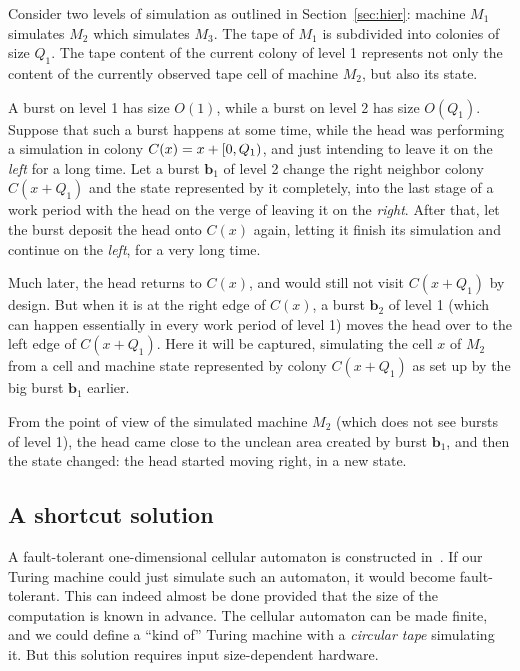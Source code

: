 \documentclass[12pt]{memoir}
\newcommand{\Q}{Q}
\begin{document}
\begin{example}[Uncleanness]
Consider two levels of simulation as outlined in Section~\ref{sec:hier}: 
machine \( M_{1} \) simulates \( M_{2} \) which simulates \( M_{3} \).
The tape of \( M_{1} \) is subdivided into colonies of size \( \Q_{1} \).
The tape content of the 
current colony of level 1 represents not only the content of the currently
observed tape cell of machine \( M_{2} \), but also its state.

A burst on level 1 has size \( O(1) \), while a burst on level 2 has size \( O(\Q_{1}) \).
Suppose that such a burst happens at some time, while the head was
performing a simulation in colony \( C(x)=x+\lint{0}{\Q_{1}} \),
and just intending to leave it on the \emph{left} for a long time.
Let a burst \( \mathbf{b}_{1} \) of level 2 change the right neighbor colony \( C(x+\Q_{1}) \) 
and the state represented by it 
completely, into the last stage of a work period with the 
head on the verge of leaving it on the \emph{right}.
After that, let the burst deposit the head onto \( C(x) \) again, letting it finish
its simulation and continue on the \emph{left}, for a very long time.

Much later, the head returns to \( C(x) \), and would still not visit \( C(x+\Q_{1}) \) by
design.
But when it is at the right edge of \( C(x) \),
a burst \( \mathbf{b}_{2} \) of level 1 (which can happen essentially in every work period of level 1)
moves the head over to the left edge of \( C(x+\Q_{1}) \).
Here it will be captured, simulating the cell \( x \) of \( M_{2} \) from a cell and machine state 
represented by colony \( C(x+\Q_{1}) \) as set up by 
the big burst \( \mathbf{b}_{1} \) earlier.

From the point of view of the simulated machine \( M_{2} \) (which does not see bursts
of level 1), the head came close to the unclean area created by burst \( \mathbf{b}_{1} \), and then 
the state changed: the head started moving right, in a new state.
\end{example}


\subsection{A shortcut solution}

A fault-tolerant one-dimensional cellular automaton is constructed
in~\cite{GacsSorg01}.
If our Turing machine could just simulate such an automaton, it would become
fault-tolerant.
This can indeed almost be done provided that the size of the computation is known in advance.
The cellular automaton can be made finite, and we could define
a ``kind of'' Turing machine with a \emph{circular tape} simulating it.
But this solution requires input size-dependent hardware.
\end{document}
